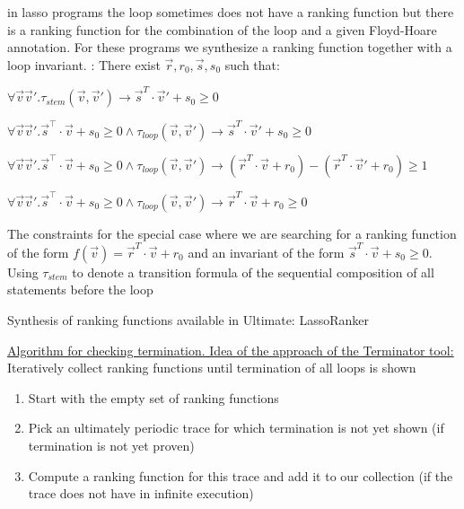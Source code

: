 \documentclass[landscape, a4paper]{article}
\begin{document}
\begin{minipage}[t]{0.2\linewidth}
\begin{betterlist}
		\item in lasso programs the loop sometimes does not have a ranking function but there is a ranking function for the combination of the loop and a given Floyd-Hoare annotation. For these programs we synthesize a ranking function together with a loop invariant. : There exist $\vec{r}, r_0, \vec{s}, s_0$ such that:
		\begin{betterlist}
			\item $\forall\vec{v}\vec{v}'.\tau_{stem}(\vec{v},\vec{v}') \rightarrow\vec{s}^T\cdot \vec{v}' + s_0 \geq 0$
			\item $\forall\vec{v}\vec{v}'.\vec{s}^⊺\cdot \vec{v} + s_0 \geq 0 \land \tau_{loop}(\vec{v},\vec{v}') \rightarrow\vec{s}^T\cdot \vec{v}' + s_0 \geq 0$
			\item $\forall\vec{v}\vec{v}'.\vec{s}^⊺\cdot \vec{v} + s_0 \geq 0 \land \tau_{loop}(\vec{v},\vec{v}') \rightarrow (\vec{r}^T\cdot \vec{v} + r_0) −(\vec{r}^T\cdot \vec{v}'  + r_0) \geq 1$
			\item $\forall\vec{v}\vec{v}'.\vec{s}^⊺\cdot \vec{v} + s_0 \geq 0 \land \tau_{loop}(\vec{v},\vec{v}') \rightarrow\vec{r}^T\cdot \vec{v} + r_0 \geq 0$
		\end{betterlist}
		\begin{betterlist}
			\item The constraints for the special case where we are searching for a ranking function of the form $f(\vec{v}) =\vec{r}^T\cdot \vec{v} + r_0$ and an invariant of the form $\vec{s}^T\cdot \vec{v} + s_0 \geq 0$. Using $\tau_{stem}$ to denote a transition formula of the sequential composition of all statements before the loop
		\end{betterlist}
		\item Synthesis of ranking functions available in Ultimate: \alert{LassoRanker}
	\end{betterlist}
	\begin{betterlist}
		\item \underline{Algorithm for checking termination. Idea of the approach of the Terminator tool:} Iteratively collect ranking functions until termination of all loops is shown
		\begin{enumerate}
			\item Start with the empty set of ranking functions
			\item Pick an ultimately periodic trace for which termination is not yet shown (if termination is not yet proven)
			\item Compute a ranking function for this trace and add it to our collection (if the trace does not have in infinite execution)

\end{enumerate}
\end{betterlist}
\end{minipage}
\end{document}
